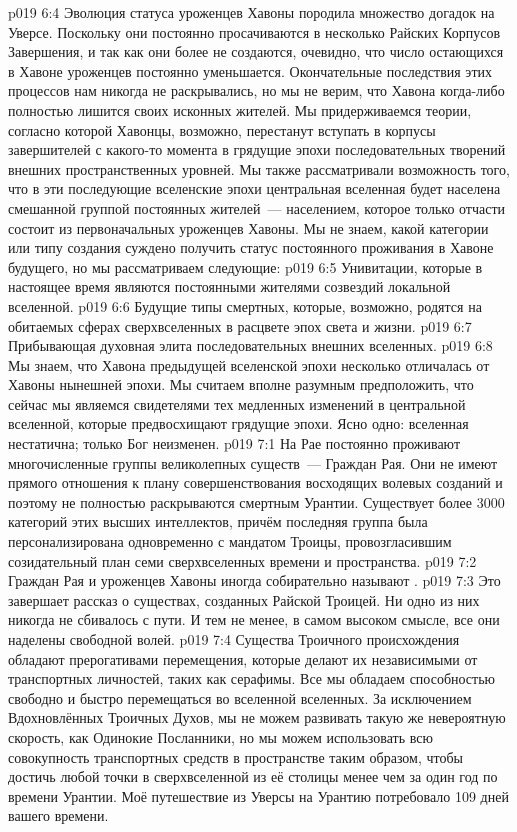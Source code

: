 \vs p019 6:4 \pc Эволюция статуса уроженцев Хавоны породила множество догадок на Уверсе. Поскольку они постоянно просачиваются в несколько Райских Корпусов Завершения, и так как они более не создаются, очевидно, что число остающихся в Хавоне уроженцев постоянно уменьшается. Окончательные последствия этих процессов нам никогда не раскрывались, но мы не верим, что Хавона когда\hyp{}либо полностью лишится своих исконных жителей. Мы придерживаемся теории, согласно которой Хавонцы, возможно, перестанут вступать в корпусы завершителей с какого\hyp{}то момента в грядущие эпохи последовательных творений внешних пространственных уровней. Мы также рассматривали возможность того, что в эти последующие вселенские эпохи центральная вселенная будет населена смешанной группой постоянных жителей~--- населением, которое только отчасти состоит из первоначальных уроженцев Хавоны. Мы не знаем, какой категории или типу создания суждено получить статус постоянного проживания в Хавоне будущего, но мы рассматриваем следующие:
\vs p019 6:5 Унивитации, которые в настоящее время являются постоянными жителями созвездий локальной вселенной.
\vs p019 6:6 Будущие типы смертных, которые, возможно, родятся на обитаемых сферах сверхвселенных в расцвете эпох света и жизни.
\vs p019 6:7 Прибывающая духовная элита последовательных внешних вселенных.
\vs p019 6:8 Мы знаем, что Хавона предыдущей вселенской эпохи несколько отличалась от Хавоны нынешней эпохи. Мы считаем вполне разумным предположить, что сейчас мы являемся свидетелями тех медленных изменений в центральной вселенной, которые предвосхищают грядущие эпохи. Ясно одно: вселенная нестатична; только Бог неизменен.
\vs p019 7:1 На Рае постоянно проживают многочисленные группы великолепных существ~--- Граждан Рая. Они не имеют прямого отношения к плану совершенствования восходящих волевых созданий и поэтому не полностью раскрываются смертным Урантии. Существует более 3000 категорий этих высших интеллектов, причём последняя группа была персонализирована одновременно с мандатом Троицы, провозгласившим созидательный план семи сверхвселенных времени и пространства.
\vs p019 7:2 \pc Граждан Рая и уроженцев Хавоны иногда собирательно называют .
\vs p019 7:3 \pc Это завершает рассказ о существах, созданных Райской Троицей. Ни одно из них никогда не сбивалось с пути. И тем не менее, в самом высоком смысле, все они наделены свободной волей.
\vs p019 7:4 Существа Троичного происхождения обладают прерогативами перемещения, которые делают их независимыми от транспортных личностей, таких как серафимы. Все мы обладаем способностью свободно и быстро перемещаться во вселенной вселенных. За исключением Вдохновлённых Троичных Духов, мы не можем развивать такую же невероятную скорость, как Одинокие Посланники, но мы можем использовать всю совокупность транспортных средств в пространстве таким образом, чтобы достичь любой точки в сверхвселенной из её столицы менее чем за один год по времени Урантии. Моё путешествие из Уверсы на Урантию потребовало 109 дней вашего времени.
